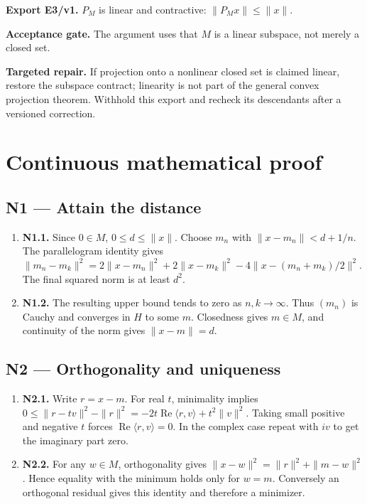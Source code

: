 \documentclass[preprint,12pt,aps,pra,showkeys,amsmath,amssymb,superscriptaddress,floatfix]{revtex4-2}
\theoremstyle{definition}
\theoremstyle{remark}
\newcommand{\field}[2]{\par\smallskip\noindent\textbf{#1.} #2\par}
\begin{document}
\field{Export E3/v1}{\(P_M\) is linear and contractive: \(\|P_Mx\|\le\|x\|\).}

\field{Acceptance gate}{The argument uses that \(M\) is a linear subspace, not merely a closed
set.}

\field{Targeted repair}{If projection onto a nonlinear closed set is claimed linear, restore the
subspace contract; linearity is not part of the general convex
projection theorem. Withhold this export and recheck its descendants
after a versioned correction.}

\endgroup\clearpage\section{Continuous mathematical proof}\label{sec:proof}

\subsection{N1 --- Attain the distance}\label{n1-attain-the-distance}

\begin{enumerate}
\def\labelenumi{\arabic{enumi}.}
\item
  \textbf{N1.1.} Since \(0\in M\), \(0\le d\le\|x\|\). Choose \(m_n\)
  with \(\|x-m_n\|<d+1/n\). The parallelogram identity gives
  \(\|m_n-m_k\|^2=2\|x-m_n\|^2+2\|x-m_k\|^2-4\|x-(m_n+m_k)/2\|^2\). The
  final squared norm is at least \(d^2\).
\item
  \textbf{N1.2.} The resulting upper bound tends to zero as
  \(n,k\to\infty\). Thus \((m_n)\) is Cauchy and converges in \(H\) to
  some \(m\). Closedness gives \(m\in M\), and continuity of the norm
  gives \(\|x-m\|=d\).
\end{enumerate}

\subsection{N2 --- Orthogonality and
uniqueness}\label{n2-orthogonality-and-uniqueness}

\begin{enumerate}
\def\labelenumi{\arabic{enumi}.}
\item
  \textbf{N2.1.} Write \(r=x-m\). For real \(t\), minimality implies
  \(0\le\|r-tv\|^2-\|r\|^2=-2t\operatorname{Re}\langle r,v\rangle+t^2\|v\|^2\).
  Taking small positive and negative \(t\) forces
  \(\operatorname{Re}\langle r,v\rangle=0\). In the complex case repeat
  with \(iv\) to get the imaginary part zero.
\item
  \textbf{N2.2.} For any \(w\in M\), orthogonality gives
  \(\|x-w\|^2=\|r\|^2+\|m-w\|^2\). Hence equality with the minimum holds
  only for \(w=m\). Conversely an orthogonal residual gives this
  identity and therefore a minimizer.
\end{enumerate}
\end{document}
